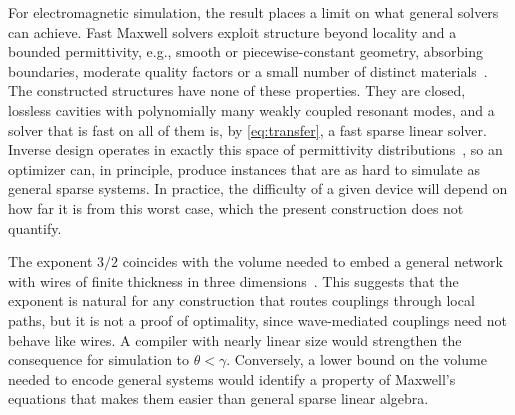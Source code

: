 For electromagnetic simulation, the result places a limit on what general
solvers can achieve. Fast Maxwell solvers exploit structure beyond locality and
a bounded permittivity, e.g., smooth or piecewise-constant geometry, absorbing
boundaries, moderate quality factors or a small number of distinct
materials~\citep{EngquistYing2011CPAM,Martinsson2019,ShinFan2013}. The
constructed structures have none of these properties. They are closed,
lossless cavities with polynomially many weakly coupled resonant modes, and a
solver that is fast on all of them is, by \cref{eq:transfer}, a fast sparse
linear solver. Inverse design operates in exactly this space of permittivity
distributions~\citep{JensenSigmund2011,Molesky2018}, so an optimizer can, in
principle, produce instances that are as hard to simulate as general sparse
systems. In practice, the difficulty of a given device will depend on how far
it is from this worst case, which the present construction does not quantify.

The exponent $3/2$ coincides with the volume needed to embed a general network
with wires of finite thickness in three
dimensions~\citep{KolmogorovBarzdin1967,GromovGuth2012}. This suggests that the
exponent is natural for any construction that routes couplings through local
paths, but it is not a proof of optimality, since wave-mediated couplings
need not behave like wires. A compiler with nearly linear size would strengthen
the consequence for simulation to $\theta<\gamma$. Conversely, a lower bound on
the volume needed to encode general systems would identify a property of
Maxwell's equations that makes them easier than general sparse linear algebra.

